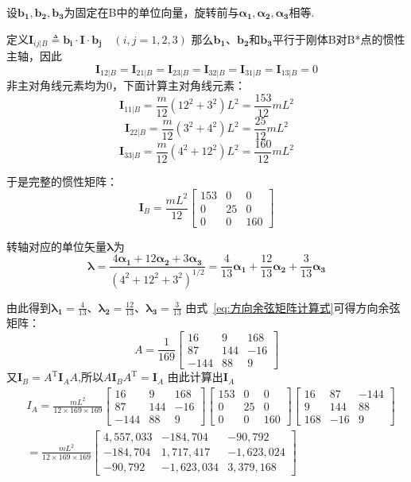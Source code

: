 \begin{solution}
    设$\boldsymbol{b_1}, \boldsymbol{b_2}, \boldsymbol{b_3}$为固定在B中的单位向量，旋转前与$\boldsymbol{\alpha_1}, \boldsymbol{\alpha_2}, \boldsymbol{\alpha_3}$相等.

    定义$\mathbf{I}_{ij|B}\triangleq\boldsymbol{b_i} \cdot \mathbf{I} \cdot \boldsymbol{b_j} \quad(i,j=1,2,3)$
    那么$\boldsymbol{b_1}$、$\boldsymbol{b_2}$和$\boldsymbol{b_3}$平行于刚体B对B*点的惯性主轴，因此
    $$\mathbf{I}_{12|B}=\mathbf{I}_{21|B}=\mathbf{I}_{23|B}=\mathbf{I}_{32|B}=\mathbf{I}_{31|B}=\mathbf{I}_{13|B}=0$$
    非主对角线元素均为0，下面计算主对角线元素：
    $$\mathbf{I}_{11|B}=\frac{m}{12}(12^{2}+3^{2})L^{2}=\frac{153}{12}mL^{2}$$
    $$\mathbf{I}_{22|B}=\frac{m}{12}(3^2+4^2)L^2=\frac{25}{12}mL^2$$
    $$\mathbf{I}_{33|B}=\frac{m}{12}(4^2+12^2)L^2=\frac{160}{12}mL^2$$

    于是完整的惯性矩阵：$$\mathbf{I}_B=\frac{mL^2}{12}\begin{bmatrix}153&0&0\\0&25&0\\0&0&160\end{bmatrix}$$

    转轴对应的单位矢量$\boldsymbol{\lambda}$为$$\mathbf{\lambda}=\frac{4\boldsymbol{\alpha_1}+12\boldsymbol{\alpha_2}+3\boldsymbol{\alpha_3}}{(4^{2}+12^{2}+3^{2})^{1/2}}=\frac{4}{13}\boldsymbol{\alpha_1}+\frac{12}{13}\boldsymbol{\alpha_2}+\frac{3}{13}\boldsymbol{\alpha_3}$$

    由此得到$\boldsymbol{\lambda_1}=\frac{4}{13}$、$\boldsymbol{\lambda_2}=\frac{12}{13}$、$\boldsymbol{\lambda_3}=\frac{3}{13}$
    由式~\eqref{eq:方向余弦矩阵计算式}可得方向余弦矩阵：
    $$A=\frac{1}{169}\begin{bmatrix}16&9&168\\87&144&-16\\-144&88&9\end{bmatrix}$$
    又$\mathbf{I}_B=A^\mathrm{T}\mathbf{I}_A A$,所以$A\mathbf{I}_B A^\mathrm{T}=\mathbf{I}_A $
    由此计算出$\mathbf{I}_A$ $$\begin{aligned}
        &I_{A}=\frac{mL^{2}}{12\times169\times169}\begin{bmatrix}16&9&168\\87&144&-16\\-144&88&9\end{bmatrix}\begin{bmatrix}153&0&0\\0&25&0\\0&0&160\end{bmatrix}\begin{bmatrix}16&87&-144\\9&144&88\\168&-16&9\end{bmatrix}\\&=\frac{mL^{2}}{12\times169\times169}\begin{bmatrix}4,557,033&-184,704&-90,792\\-184,704&1,717,417&-1,623,024\\-90,792&-1,623,034&3,379,168\end{bmatrix}
    \end{aligned}$$

\end{solution}

